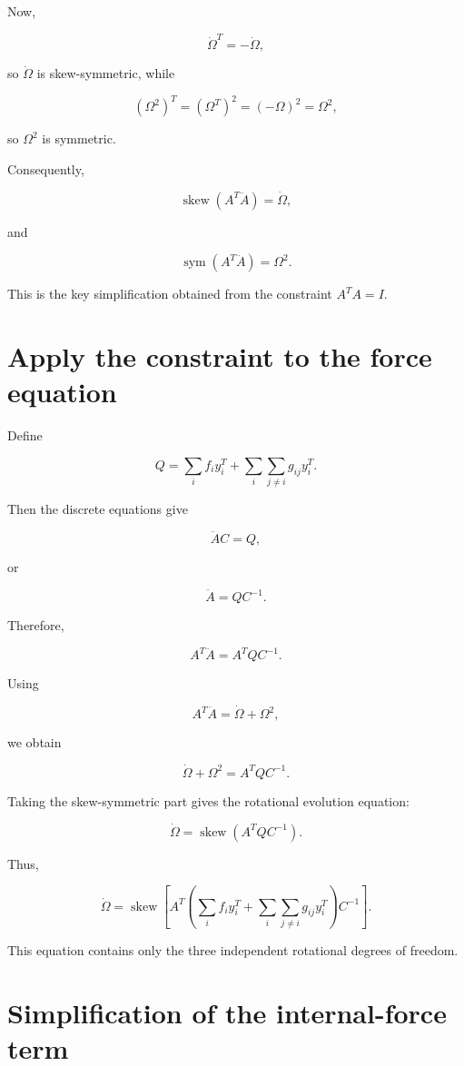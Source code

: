 \documentclass{article}
\begin{document}
Now,

\[
\dot\Omega^T = -\dot\Omega,
\]

so \(\dot\Omega\) is skew-symmetric, while

\[
(\Omega^2)^T = (\Omega^T)^2 = (-\Omega)^2 = \Omega^2,
\]

so \(\Omega^2\) is symmetric.

Consequently,

\[
\operatorname{skew}(A^T\ddot A)=\dot\Omega,
\]

and

\[
\operatorname{sym}(A^T\ddot A)=\Omega^2.
\]

This is the key simplification obtained from the constraint \(A^T A=I\).

\section{Apply the constraint to the force equation}

Define

\[
Q = \sum_i f_i y_i^T + \sum_i\sum_{j\ne i}g_{ij}y_i^T.
\]

Then the discrete equations give

\[
\ddot A C=Q,
\]

or

\[
\ddot A=QC^{-1}.
\]

Therefore,

\[
A^T\ddot A = A^TQC^{-1}.
\]

Using

\[
A^T\ddot A = \dot\Omega+\Omega^2,
\]

we obtain

\[
\dot\Omega+\Omega^2 = A^TQC^{-1}.
\]

Taking the skew-symmetric part gives the rotational evolution equation:

\[
\dot\Omega = \operatorname{skew} \left(A^TQC^{-1}\right).
\]

Thus,

\[
\dot\Omega = \operatorname{skew} \left[ A^T \left( \sum_i f_i y_i^T + \sum_i\sum_{j\ne i}g_{ij}y_i^T \right) C^{-1} \right].
\]

This equation contains only the three independent rotational degrees of freedom.

\section{Simplification of the internal-force term}
\end{document}

